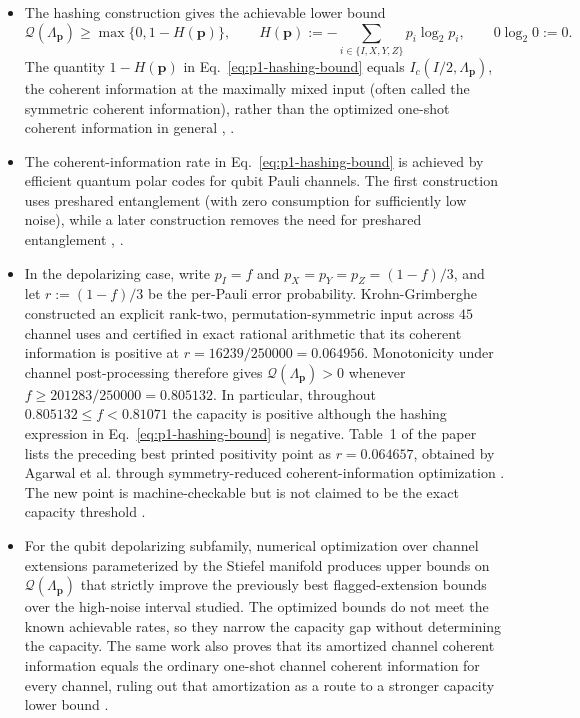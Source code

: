 \begin{itemize}
  \item The hashing construction gives the achievable lower bound
  \begin{equation}
    \mathcal{Q}(\Lambda_{\mathbf p})\ge \max\{0,1-H(\mathbf p)\},
    \qquad
    H(\mathbf p):=-\sum_{i\in\{I,X,Y,Z\}}p_i\log_2p_i,
    \qquad 0\log_2 0:=0.
    \label{eq:p1-hashing-bound}
  \end{equation}
  The quantity $1-H(\mathbf p)$ in Eq.~\eqref{eq:p1-hashing-bound} equals
  $I_c(I/2,\Lambda_{\mathbf p})$, the coherent information at the maximally
  mixed input (often called the symmetric coherent information), rather than
  the optimized one-shot coherent information in general
  , .

  \item The coherent-information rate in Eq.~\eqref{eq:p1-hashing-bound} is
  achieved by efficient quantum polar codes for qubit Pauli channels.  The
  first construction uses preshared entanglement (with zero consumption for
  sufficiently low noise), while a later construction removes the need for
  preshared entanglement ,
  .

  \item In the depolarizing case, write $p_I=f$ and
  $p_X=p_Y=p_Z=(1-f)/3$, and let $r:=(1-f)/3$ be the per-Pauli error
  probability.  Krohn-Grimberghe constructed an explicit rank-two,
  permutation-symmetric input across $45$ channel uses and certified in exact
  rational arithmetic that its coherent information is positive at
  $r=16239/250000=0.064956$.  Monotonicity under channel post-processing
  therefore gives $\mathcal Q(\Lambda_{\mathbf p})>0$ whenever
  $f\ge201283/250000=0.805132$.  In particular, throughout
  $0.805132\le f<0.81071$ the capacity is positive although the hashing
  expression in Eq.~\eqref{eq:p1-hashing-bound} is negative.  Table~1 of the
  paper lists the preceding best printed positivity point as $r=0.064657$,
  obtained by Agarwal et al. through symmetry-reduced coherent-information
  optimization .  The new point is
  machine-checkable but is not claimed to be the exact capacity threshold
  .

  \item For the qubit depolarizing subfamily, numerical optimization over
  channel extensions parameterized by the Stiefel manifold produces upper
  bounds on $\mathcal Q(\Lambda_{\mathbf p})$ that strictly improve the
  previously best flagged-extension bounds over the high-noise interval
  studied.  The optimized bounds do not meet the known achievable rates, so
  they narrow the capacity gap without determining the capacity.  The same
  work also proves that its amortized channel coherent information equals the
  ordinary one-shot channel coherent information for every channel, ruling
  out that amortization as a route to a stronger capacity lower bound
  .


\end{itemize}

